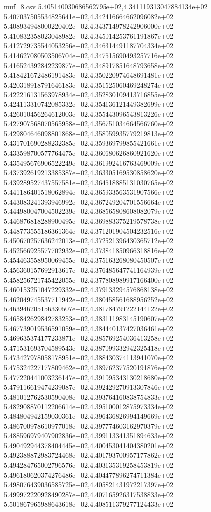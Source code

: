 \begin{filecontents*}{muf_8.csv}
5.405140030686562795e+02,4.341119313047884134e+02
5.407037505534825641e+02,4.342416664662096082e+02
5.408934948000220402e+02,4.343714978242906000e+02
5.410832358023048982e+02,4.345014253761191867e+02
5.412729735544053256e+02,4.346314491187704334e+02
5.414627080503506704e+02,4.347615690493257716e+02
5.416524392842239877e+02,4.348917851648793658e+02
5.418421672486191483e+02,4.350220974648691481e+02
5.420318918791646183e+02,4.351525060469248274e+02
5.422216131563978934e+02,4.352830109413716855e+02
5.424113310742085332e+02,4.354136121449382699e+02
5.426010456264612003e+02,4.355443096543813226e+02
5.427907568070565958e+02,4.356751034664566760e+02
5.429804646098801868e+02,4.358059935779219813e+02
5.431701690288232385e+02,4.359369799855421661e+02
5.433598700577764475e+02,4.360680626860921620e+02
5.435495676906522249e+02,4.361992416763469009e+02
5.437392619213385387e+02,4.363305169530858620e+02
5.439289527437557581e+02,4.364618885131030765e+02
5.441186401518062894e+02,4.365933563531907566e+02
5.443083241393946992e+02,4.367249204701556664e+02
5.444980047004502239e+02,4.368565808608082079e+02
5.446876818288900495e+02,4.369883375219578738e+02
5.448773555186361364e+02,4.371201904504232516e+02
5.450670257636242013e+02,4.372521396430365712e+02
5.452566925577702932e+02,4.373841850966318816e+02
5.454463558950069455e+02,4.375163268080450507e+02
5.456360157692913617e+02,4.376485647741164939e+02
5.458256721745422055e+02,4.377808989917166400e+02
5.460153251047229332e+02,4.379133294576868138e+02
5.462049745537711942e+02,4.380458561688956252e+02
5.463946205156330507e+02,4.381784791222144122e+02
5.465842629842783253e+02,4.383111983145190607e+02
5.467739019536591059e+02,4.384440137427036461e+02
5.469635374177233871e+02,4.385769254036413258e+02
5.471531693704589543e+02,4.387099332942325418e+02
5.473427978058178951e+02,4.388430374113941070e+02
5.475324227177809462e+02,4.389762377520191876e+02
5.477220441003236147e+02,4.391095343130218680e+02
5.479116619474239087e+02,4.392429270913307846e+02
5.481012762530590408e+02,4.393764160838754833e+02
5.482908870112206614e+02,4.395100012875973334e+02
5.484804942159030361e+02,4.396436826994149669e+02
5.486700978610977018e+02,4.397774603162970379e+02
5.488596979407902836e+02,4.399113341351894633e+02
5.490492944378404445e+02,4.400453041404380201e+02
5.492388872983724468e+02,4.401793700957177862e+02
5.494284765002796576e+02,4.403135319258453819e+02
5.496180620374276486e+02,4.404477896274711384e+02
5.498076439036585725e+02,4.405821431972217397e+02
5.499972220928490287e+02,4.407165926317538833e+02
5.501867965988643618e+02,4.408511379277124433e+02

\end{filecontents*}
